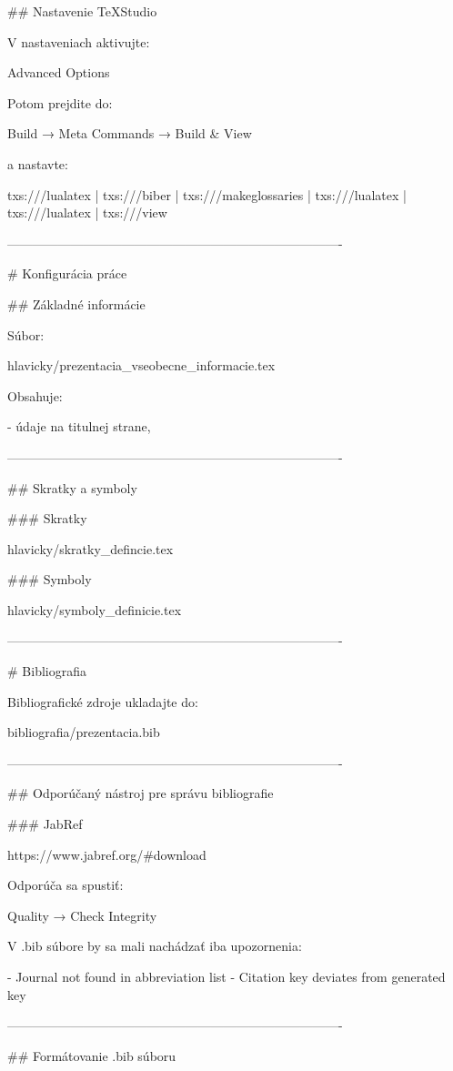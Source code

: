 ## Nastavenie TeXStudio

V nastaveniach aktivujte:

Advanced Options

Potom prejdite do:

Build → Meta Commands → Build & View

a nastavte:

txs:///lualatex |
txs:///biber |
txs:///makeglossaries |
txs:///lualatex |
txs:///lualatex |
txs:///view

-------------------------------------------------------------------------------

# Konfigurácia práce

## Základné informácie

Súbor:

hlavicky/prezentacia_vseobecne_informacie.tex

Obsahuje:

- údaje na titulnej strane,

-------------------------------------------------------------------------------

## Skratky a symboly

### Skratky

hlavicky/skratky_defincie.tex

### Symboly

hlavicky/symboly_definicie.tex

-------------------------------------------------------------------------------

# Bibliografia

Bibliografické zdroje ukladajte do:

bibliografia/prezentacia.bib

-------------------------------------------------------------------------------

## Odporúčaný nástroj pre správu bibliografie

### JabRef

https://www.jabref.org/#download

Odporúča sa spustiť:

Quality → Check Integrity

V .bib súbore by sa mali nachádzať iba upozornenia:

- Journal not found in abbreviation list
- Citation key deviates from generated key

-------------------------------------------------------------------------------

## Formátovanie .bib súboru

